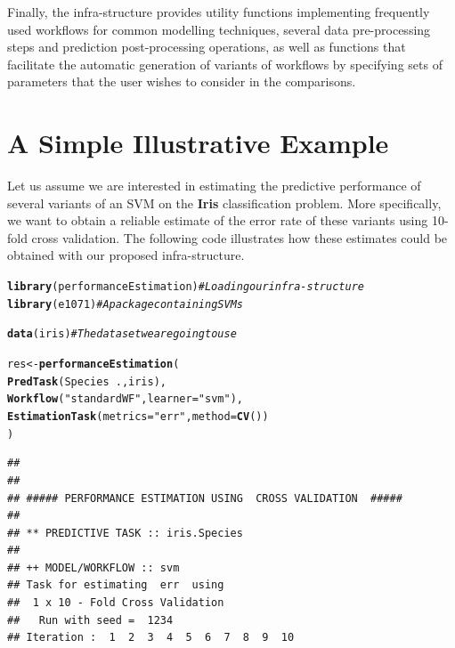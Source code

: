 \documentclass[10pt,a4paper]{article}\usepackage[]{graphicx}\usepackage[]{color}
\makeatletter
\newcommand{\hlstr}[1]{\textcolor[rgb]{0.192,0.494,0.8}{#1}}%
\newcommand{\hlcom}[1]{\textcolor[rgb]{0.678,0.584,0.686}{\textit{#1}}}%
\newcommand{\hlopt}[1]{\textcolor[rgb]{0,0,0}{#1}}%
\newcommand{\hlstd}[1]{\textcolor[rgb]{0.345,0.345,0.345}{#1}}%
\newcommand{\hlkwb}[1]{\textcolor[rgb]{0.69,0.353,0.396}{#1}}%
\newcommand{\hlkwc}[1]{\textcolor[rgb]{0.333,0.667,0.333}{#1}}%
\newcommand{\hlkwd}[1]{\textcolor[rgb]{0.737,0.353,0.396}{\textbf{#1}}}%
\newenvironment{kframe}{%
 \def\at@end@of@kframe{}%
 \ifinner\ifhmode%
  \def\at@end@of@kframe{\end{minipage}}%
  \begin{minipage}{\columnwidth}%
 \fi\fi%
 \def\FrameCommand##1{\hskip\@totalleftmargin \hskip-\fboxsep
 \colorbox{shadecolor}{##1}\hskip-\fboxsep
     \hskip-\linewidth \hskip-\@totalleftmargin \hskip\columnwidth}%
 \MakeFramed {\advance\hsize-\width
   \@totalleftmargin\z@ \linewidth\hsize
   \@setminipage}}%
 {\par\unskip\endMakeFramed%
 \at@end@of@kframe}
\newenvironment{knitrout}{}{} %
\makeatother
\begin{document}
Finally, the infra-structure provides utility functions
implementing frequently used workflows for common modelling techniques, several data pre-processing steps and prediction post-processing operations, as
well as functions that facilitate the automatic generation of variants
of workflows by specifying sets of parameters that the user wishes to
consider in the comparisons.

\section{A Simple Illustrative Example}\label{sec:simpleEx}

Let us assume we are interested in estimating the predictive performance of several variants of
an SVM on the
\textbf{Iris} classification problem. More specifically, we want to
obtain a reliable estimate of the error rate of these variants using
10-fold cross validation. The following code illustrates how these
estimates could be obtained with our proposed infra-structure.

\begin{knitrout}\footnotesize
{}\color{fgcolor}\begin{kframe}
\begin{alltt}
\hlkwd{library}\hlstd{(performanceEstimation)}  \hlcom{# Loading our infra-structure}
\hlkwd{library}\hlstd{(e1071)}                  \hlcom{# A package containing SVMs}

\hlkwd{data}\hlstd{(iris)}                      \hlcom{# The data set we are going to use}

\hlstd{res} \hlkwb{<-} \hlkwd{performanceEstimation}\hlstd{(}
         \hlkwd{PredTask}\hlstd{(Species} \hlopt{~} \hlstd{.,iris),}
         \hlkwd{Workflow}\hlstd{(}\hlstr{"standardWF"}\hlstd{,}\hlkwc{learner}\hlstd{=}\hlstr{"svm"}\hlstd{),}
         \hlkwd{EstimationTask}\hlstd{(}\hlkwc{metrics}\hlstd{=}\hlstr{"err"}\hlstd{,}\hlkwc{method}\hlstd{=}\hlkwd{CV}\hlstd{())}
         \hlstd{)}
\end{alltt}
\begin{verbatim}
## 
## 
## ##### PERFORMANCE ESTIMATION USING  CROSS VALIDATION  #####
## 
## ** PREDICTIVE TASK :: iris.Species
## 
## ++ MODEL/WORKFLOW :: svm 
## Task for estimating  err  using
##  1 x 10 - Fold Cross Validation
## 	 Run with seed =  1234 
## Iteration :  1  2  3  4  5  6  7  8  9  10
\end{verbatim}
\end{kframe}
\end{knitrout}
\end{document}
